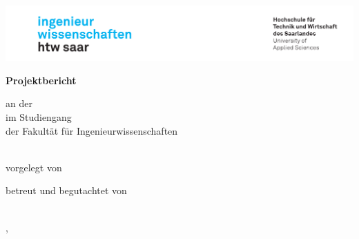 \begin{titlepage}\linespread{1.5}\selectfont
\includegraphics[width=\linewidth]{images/htwsaar_Logo_inwi_head_VF_4C_crop}
  \begin{center}
    \large  
    \hfill
    \vfill
    \begingroup
      \Large\bfseries Projektbericht
    \endgroup
		
		\bigskip
		
    an der \myUni \\
    im Studiengang \myDegreeCourse \\
    der Fakultät für Ingenieurwissenschaften \\ 
    
  \vfill
	
  \begingroup
    \Large\bfseries\myTitle 
  \endgroup
	
	\bigskip
	
  vorgelegt von \\
  \myName
	
  \vfill
	
  betreut und begutachtet von \\
  \myFirstProf \\
	
  \vfill
	
  \myLocation, \myTime                   

    \end{center}       
\end{titlepage}   
